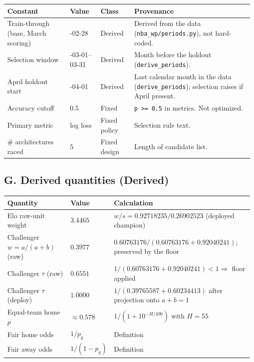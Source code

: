\documentclass[10pt]{article}
\newcommand{\cls}[1]{\textbf{#1}}
\newcommand{\code}[1]{\texttt{#1}}
\begin{document}
\begin{longtable}{@{}>{\raggedright\arraybackslash}p{1.5in}
>{\raggedright\arraybackslash}p{1.35in}
>{\raggedright\arraybackslash}p{0.72in}
>{\raggedright\arraybackslash}p{2.55in}@{}}
\toprule
\textbf{Constant} & \textbf{Value} & \textbf{Class} & \textbf{Provenance} \\
\midrule
\endhead
Train-through (base, March scoring) & 2026-02-28 & Derived & Derived from the data (\code{nba\_wp/periods.py}), not hard-coded. \\
Selection window & 2026-03-01--03-31 & Derived & Month before the holdout (\code{derive\_periods}). \\
April holdout start & 2026-04-01 & Derived & Last calendar month in the data (\code{derive\_periods}); selection raises if April present. \\
Accuracy cutoff & \(0.5\) & Fixed & \code{p >= 0.5} in metrics. Not optimized. \\
Primary metric & log loss & Fixed policy & Selection rule text. \\
\# architectures raced & \(5\) & Fixed design & Length of candidate list. \\
\bottomrule
\end{longtable}

\subsection{G. Derived quantities (\cls{Derived})}

\begin{longtable}{@{}>{\raggedright\arraybackslash}p{1.2in}
>{\raggedright\arraybackslash}p{0.85in}
>{\raggedright\arraybackslash}p{4.1in}@{}}
\toprule
\textbf{Quantity} & \textbf{Value} & \textbf{Calculation} \\
\midrule
\endhead
Elo raw-unit weight & \(3.4465\) & \(w/s=0.92718235/0.26902523\) (deployed champion) \\
Challenger \(w=a/(a+b)\) (raw) & \(0.3977\) & \(0.60763176/(0.60763176+0.92040241)\); preserved by the floor \\
Challenger \(\tau\) (raw) & \(0.6551\) & \(1/(0.60763176+0.92040241)<1\Rightarrow\) floor applied \\
Challenger \(\tau\) (deploy) & \(1.0000\) & \(1/(0.39765587+0.60234413)\) after projection onto \(a+b=1\) \\
Equal-team home \(p\) & \(\approx 0.578\) & \(1/(1+10^{-H/400})\) with \(H=55\) \\
Fair home odds & \(1/p_g\) & Definition \\
Fair away odds & \(1/(1-p_g)\) & Definition \\
\bottomrule
\end{longtable}
\end{document}

